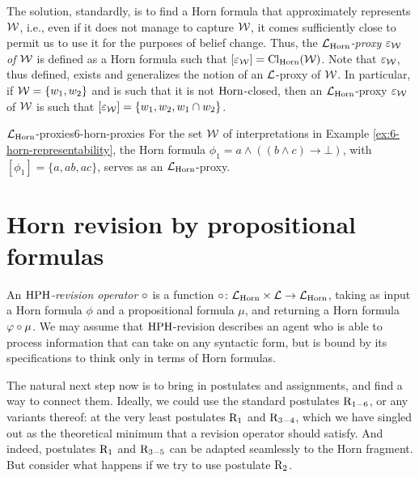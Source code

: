 The solution, standardly, is to find a Horn formula that 
approximately represents $\mathcal{W}$, 
i.e., even if it does not manage to capture $\mathcal{W}$, 
it comes sufficiently close to 
permit us to use it for the purposes of belief change.
Thus, the \emph{$\mathcal{L}_{\mathrm{Horn}}$-proxy $\varepsilon_{\mathcal{W}}$ of $\mathcal{W}$} is defined
as a Horn formula such that $[\varepsilon_{\mathcal{W}}]={\operatorname{Cl}}_{\mathrm{Horn}}(\mathcal{W})$.
Note that $\varepsilon_{\mathcal{W}}$, thus defined, exists and generalizes the notion 
of an $\mathcal{L}$-proxy of $\mathcal{W}$.
In particular, if $\mathcal{W}=\{w_1,w_2\}$ and is such that it is not $\mathrm{Horn}$-closed,
then an $\mathcal{L}_{\mathrm{Horn}}$-proxy $\varepsilon_{\mathcal{W}}$ of $\mathcal{W}$ is such that
$[\varepsilon_{\mathcal{W}}]=\{w_1,w_2,w_1\cap w_2\}$.

\begin{xmpl}{$\mathcal{L}_{\mathrm{Horn}}$-proxies}{6-horn-proxies}
	For the set $\mathcal{W}$ of interpretations in Example \ref{ex:6-horn-representability},
	the Horn formula $\phi_{1}=a\land ((b\land c)\rightarrow\bot)$,
	with $[\phi_{1}]=\{a,ab,ac\}$,
	serves as an $\mathcal{L}_{\mathrm{Horn}}$-proxy.
\end{xmpl}























\section{Horn revision by propositional formulas}\label{sec:6-revision-hph}
An \emph{${\mathrm{HPH}}$-revision operator $\circ$}
is a function $\circ\colon\mathcal{L}_{\mathrm{Horn}}\times\mathcal{L}\rightarrow\mathcal{L}_{\mathrm{Horn}}$,
taking as input 
a Horn formula $\phi$ and a propositional formula $\mu$,
and returning a Horn formula $\varphi\circ\mu$.
We may assume that ${\mathrm{HPH}}$-revision describes an agent who is able
to process information that can take on any syntactic form, 
but is bound by its specifications to think only 
in terms of Horn formulas.

The natural next step now is to bring in postulates 
and assignments, and find a way to connect them. 
Ideally, we could use the standard postulates $\mathrm{R}_{1-6}$, or any variants thereof:
at the very least postulates $\mathrm{R}_{1}$ and $\mathrm{R}_{3-4}$, which we have singled out 
as the theoretical minimum that a revision operator should satisfy.
And indeed, postulates $\mathrm{R}_{1}$ and $\mathrm{R}_{3-5}$ can be adapted seamlessly to the Horn fragment.
But consider what happens if we try to use postulate $\mathrm{R}_{2}$.

